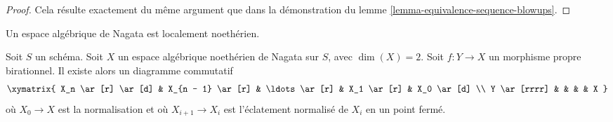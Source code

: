 \begin{proof}
Cela résulte exactement du même argument que dans la démonstration du lemme
\ref{lemma-equivalence-sequence-blowups}.
\end{proof}

\noindent
Un espace algébrique de Nagata est localement noethérien.

\begin{lemma}
\label{lemma-dominate-by-normalized-blowing-up}
Soit $S$ un schéma. Soit $X$ un espace algébrique noethérien de Nagata sur
$S$, avec $\dim(X) = 2$. Soit $f : Y \to X$ un morphisme propre birationnel.
Il existe alors un diagramme commutatif
$$
\xymatrix{
X_n \ar[r] \ar[d] &
X_{n - 1} \ar[r] &
\ldots \ar[r] &
X_1 \ar[r] &
X_0 \ar[d] \\
Y \ar[rrrr]  & & & & X
}
$$
où $X_0 \to X$ est la normalisation et où $X_{i + 1} \to X_i$ est
l'éclatement normalisé de $X_i$ en un point fermé.
\end{lemma}

